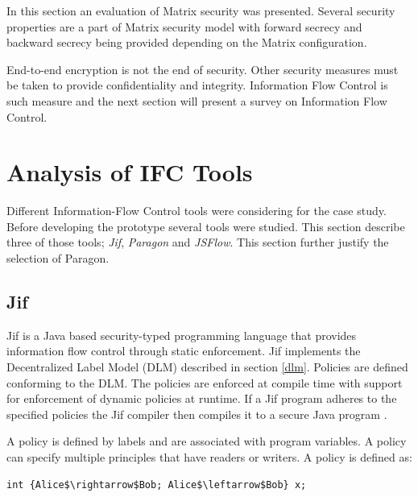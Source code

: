 In this section an evaluation of Matrix security was presented. Several security properties are a part of Matrix security model with forward secrecy and backward secrecy being provided depending on the Matrix configuration.

End-to-end encryption is not the end of security. Other security measures must be taken to provide confidentiality and integrity. Information Flow Control is such measure and the next section will present a survey on Information Flow Control.


\newpage
\section{Analysis of IFC Tools}

Different Information-Flow Control tools were considering for the case study. Before developing the prototype several tools were studied. This section describe three of those tools; \emph{Jif}, \emph{Paragon} and \emph{JSFlow}. This section further justify the selection of Paragon.

\subsection{Jif}

Jif is a Java based security-typed programming language that provides information flow control through static enforcement. Jif implements the Decentralized Label Model (DLM) described in section \ref{dlm}. Policies are defined conforming to the DLM. The policies are enforced at compile time with support for enforcement of dynamic policies at runtime. If a Jif program adheres to the specified policies the Jif compiler then compiles it to a secure Java program \cite{jifmanual}. 

A policy is defined by labels and are associated with program variables. A policy can specify multiple principles that have readers or writers. A policy is defined as: 

\begin{lstlisting}[mathescape]
int {Alice$\rightarrow$Bob; Alice$\leftarrow$Bob} x;
\end{lstlisting}

